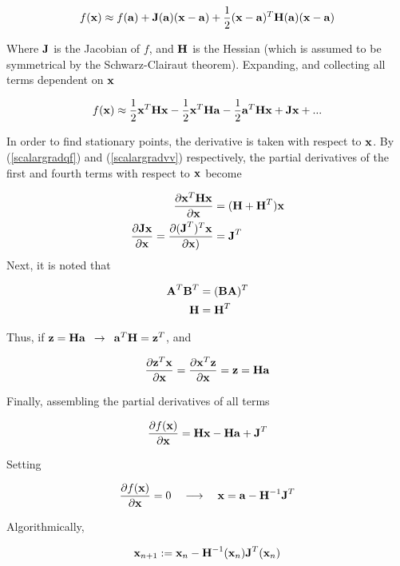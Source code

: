 \documentclass{article}
\newcommand{\vect}[1]{\textbf{\textrm{#1}}}
\newcommand{\pd}[2]{\frac{\partial {#1}}{\partial {#2}}}
\begin{document}
\begin{equation} \label{taylornd}
	f(\vect{x}) \approx f(\vect{a}) + \vect{J}(\vect{a})(\vect{x} - \vect{a}) + 
						 \frac{1}{2}(\vect{x} - \vect{a})^{T}\vect{H}(\vect{a})(\vect{x} - \vect{a})
\end{equation}

Where $\vect{J}$ is the Jacobian of $f$, and $\vect{H}$ is the Hessian (which is assumed to be symmetrical by the Schwarz-Clairaut theorem). 
Expanding, and collecting all terms dependent on $\vect{x}$

\begin{equation*}
	f(\vect{x}) \approx \frac{1}{2}\vect{x}^{T}\vect{Hx} - \frac{1}{2}\vect{x}^{T}\vect{Ha} -
						 \frac{1}{2}\vect{a}^{T}\vect{Hx} + \vect{Jx} + ...
\end{equation*}

In order to find stationary points, the derivative is taken with respect to $\vect{x}$. 
By (\ref{scalargradqf}) and (\ref{scalargradvv}) respectively, the partial derivatives of the first and fourth terms with respect to $\vect{x}$ become

\begin{align*}
	\pd{\vect{x}^{T}\vect{Hx}}{\vect{x}} & = (\vect{H} + \vect{H}^{T})\vect{x} \\
	\pd{\vect{Jx}}{\vect{x}} = \pd{(\vect{J}^{T})^{T}\vect{x}}{\vect{x})} & = \vect{J}^{T}
\end{align*}
Next, it is noted that

\begin{align*}
	\vect{A}^{T}\vect{B}^{T} & = (\vect{BA})^{T} \\
	\vect{H} & = \vect{H}^{T}
\end{align*}
	
Thus, if $\vect{z} = \vect{Ha} \enspace \rightarrow \enspace \vect{a}^{T}\vect{H} = \vect{z}^{T}$, and

\begin{equation*}
	\pd{\vect{z}^{T}\vect{x}}{\vect{x}} = \pd{\vect{x}^{T}\vect{z}}{\vect{x}} = 
	\vect{z} = \vect{Ha}
\end{equation*}

Finally, assembling the partial derivatives of all terms

\begin{equation}
	\pd{f(\vect{x})}{\vect{x}} = \vect{Hx} - \vect{Ha} + \vect{J}^{T}
\end{equation}

Setting

\begin{equation*}
	\pd{f(\vect{x})}{\vect{x}} = 0 \quad \longrightarrow \quad 
	\vect{x} = \vect{a} - \vect{H}^{-1}\vect{J}^{T}
\end{equation*}

Algorithmically,

\begin{equation}
	\vect{x}_{n+1} := \vect{x}_n - \vect{H}^{-1}(\vect{x}_n)\vect{J}^{T}(\vect{x}_n) \label{updaterule2}
\end{equation}



\end{document}
